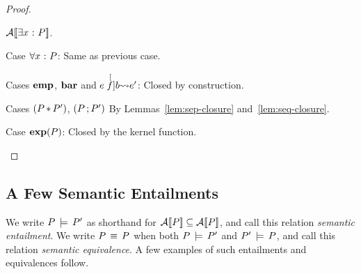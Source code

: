 \documentclass[11pt]{report}
\begin{document}
\begin{proof}
\begin{description}
{			$\mathcal{A}[\![\exists x \operatorname{\,:\,} P]\!]$.
		
		}
		
		\item{Case $\forall x \operatorname{\,:\,} P$:} Same as previous case. 
		
		\item{Cases $\operatorname{\mathbf{emp}}$, $\operatorname{\mathbf{bar}}$ and $e \stackrel[f]{b}{\leadsto} e'$:} Closed by construction.
		
		\item{Cases $(P \operatorname{\ast} P')$, $(P \operatorname{;} P')$} By Lemmas~\ref{lem:sep-closure} and~\ref{lem:seq-closure}. 
		
		\item{Case $\operatorname{\mathbf{exp}}(P)$:} Closed by the kernel function. 
		
	\end{description}
	
\end{proof}

\subsection{A Few Semantic Entailments} %
\label{sec:a_few_semantic_entailments}

We write $P \,\models\, P'$ as shorthand for $\mathcal{A}[\![P]\!] \subseteq \mathcal{A}[\![P]\!]$, and call this relation \emph{semantic entailment}. We write $P \,\equiv\, P$ when both $P \,\models\, P'$ and $P' \,\models\, P$, and call this relation \emph{semantic equivalence}. A few examples of such entailments and equivalences follow. 
\end{document}
